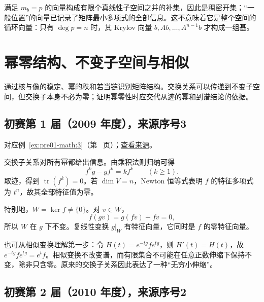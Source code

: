 \documentclass[UTF8,12pt,a4paper,fontset=fandol]{ctexart}
\begin{document}
\begin{remark}[方法与条件]

满足 $m_b=p$ 的向量构成有限个真线性子空间之并的补集，因此是稠密开集；“一般位置”的向量已记录了矩阵最小多项式的全部信息。这不意味着它是整个空间的循环向量：只有 $\deg p=n$ 时，其 Krylov 向量 $b,Ab,\dots,A^{n-1}b$ 才构成一组基。

\end{remark}

\section{幂零结构、不变子空间与相似}

\label{sec:solutions-6}

通过核与像的稳定、幂的秩和若当链识别矩阵结构。交换关系可以传递到不变子空间，但交换子本身不必为零；证明幂零性时应交代从迹的幂和到谱结论的依据。

\subsection{初赛第 1 届（2009 年度），来源序号3}\label{ans:pre01-math:3}\label{pr:pre01-math:3}

对应例~\ref{ex:pre01-math:3}（第~\pageref{ex:pre01-math:3} 页）；\href{https://github.com/lzxcr/cmc-mathematics/blob/64916fa1fdbc3e444a652eca204d5669058ee321/src/problems/preliminary/01/03.md}{查看来源}。

\begin{solve}

交换子关系对所有幂都给出信息。由乘积法则归纳可得
\[
f^kg-gf^k=kf^k\qquad(k\ge1).
\]
取迹，得到 $\operatorname{tr}(f^k)=0$。若 $\dim V=n$，Newton 恒等式表明 $f$ 的特征多项式为 $t^n$，故其全部特征值为零。

特别地，$W=\ker f\ne\{0\}$。对 $v\in W$，
\[
f(gv)=g(fv)+fv=0,
\]
所以 $W$ 在 $g$ 下不变。复线性变换 $g|_W$ 有特征向量，它同时是 $f$ 的零特征向量。

\end{solve}

\begin{remark}[方法与条件]

也可从相似变换理解第一步：令 $H(t)=e^{-tg}fe^{tg}$，则 $H'(t)=H(t)$，故 $e^{-tg}fe^{tg}=e^tf$。相似变换不改变谱，而有限集合不可能在任意正数伸缩下保持不变，除非只含零。原来的交换子关系因此表达了一种“无穷小伸缩”。

\end{remark}

\subsection{初赛第 2 届（2010 年度），来源序号2}\label{ans:pre02-math:2}\label{pr:pre02-math:2}
\end{document}
